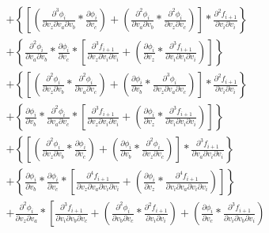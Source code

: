 \documentclass[12pt,letter]{article}
\begin{document}
\begin{equation}
\begin{split}
	\\
	&+
	\left\{\left[\left(\frac{\partial^3 \phi_i}{\partial v_z \partial v_a \partial v_b} * \frac{\partial \phi_i}{\partial v_c}\right) + \left(\frac{\partial^2 \phi_i}{\partial v_a \partial v_b} * \frac{\partial^2 \phi_i}{\partial v_z \partial v_c}\right)\right] * \frac{\partial^2 f_{i+1}}{\partial v_i \partial v_i}\right\}
	\\
	&+
	\left\{\frac{\partial^2 \phi_i}{\partial v_a \partial v_b} * \frac{\partial \phi_i}{\partial v_c} * \left[\frac{\partial^3 f_{i+1}}{\partial v_z \partial v_i \partial v_i} + \left(\frac{\partial \phi_i}{\partial v_z} * \frac{\partial^3 f_{i+1}}{\partial v_i \partial v_i \partial v_i}\right)\right]\right\}
	\\
	&+
	\left\{\left[\left(\frac{\partial^2 \phi_i}{\partial v_z \partial v_b} * \frac{\partial^2 \phi_i}{\partial v_a \partial v_c}\right) + \left(\frac{\partial \phi_i}{\partial v_b} * \frac{\partial^3 \phi_i}{\partial v_z \partial v_a \partial v_c}\right)\right] * \frac{\partial^2 f_{i+1}}{\partial v_i \partial v_i}\right\}
	\\
	&+
	\left\{\frac{\partial \phi_i}{\partial v_b} * \frac{\partial^2 \phi_i}{\partial v_a \partial v_c} * \left[\frac{\partial^3 f_{i+1}}{\partial v_z \partial v_i \partial v_i} + \left(\frac{\partial \phi_i}{\partial v_z} * \frac{\partial^3 f_{i+1}}{\partial v_i \partial v_i \partial v_i}\right)\right]\right\}
	\\
	&+
	\left\{\left[\left(\frac{\partial^2 \phi_i}{\partial v_z \partial v_b} * \frac{\partial \phi_i}{\partial v_c}\right) + \left(\frac{\partial \phi_i}{\partial v_b} * \frac{\partial^2 \phi_i}{\partial v_z \partial v_c}\right)\right] * \frac{\partial^3 f_{i+1}}{\partial v_a \partial v_i \partial v_i}\right\}
	\\
	&+
	\left\{\frac{\partial \phi_i}{\partial v_b} * \frac{\partial \phi_i}{\partial v_c} * \left[\frac{\partial^4 f_{i+1}}{\partial v_z \partial v_a \partial v_i \partial v_i} + \left(\frac{\partial \phi_i}{\partial v_z} * \frac{\partial^4 f_{i+1}}{\partial v_i \partial v_a \partial v_i \partial v_i}\right)\right]\right\}
	\\
	&+
	\frac{\partial^2 \phi_i}{\partial v_z \partial v_a} * 
	\left[\frac{\partial^3 f_{i+1}}{\partial v_i \partial v_b \partial v_c} + 
	\left(\frac{\partial^2 \phi_i}{\partial v_b \partial v_c} * \frac{\partial^2 f_{i+1}}{\partial v_i \partial v_i}\right) + 
	\left(\frac{\partial \phi_i}{\partial v_c} * \frac{\partial^3 f_{i+1}}{\partial v_i \partial v_b \partial v_i}\right) 
	\right.

\end{split}
\end{equation}
\end{document}
